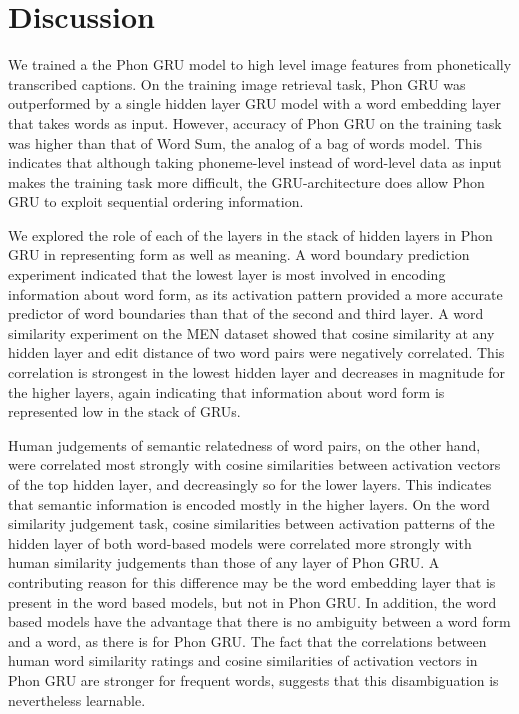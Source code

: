 \section{Discussion}
\label{sec:discussion}
We trained a the {\sc Phon GRU} model  to  high level image features  from phonetically transcribed captions. On the training image retrieval task, {\sc Phon GRU} was outperformed by a single hidden layer GRU model with a word embedding layer that takes words as input. However, accuracy of {\sc Phon GRU} on the training task was higher than that of {\sc Word Sum}, the analog of a bag of words model. This indicates that although taking phoneme-level instead of word-level data as input makes the training task more difficult, the GRU-architecture does allow {\sc Phon GRU} to exploit sequential ordering information.

We explored the role of each of the layers in the stack of hidden layers in {\sc Phon GRU} in representing form as well as meaning. A word boundary prediction experiment indicated that the lowest layer is most involved in encoding information about word form, as its activation pattern provided a more accurate predictor of word boundaries than that of the second and third layer. A word similarity experiment on the MEN dataset showed that cosine similarity at any hidden layer and edit distance of two word pairs were negatively correlated. This correlation is strongest in the lowest hidden layer and decreases in magnitude for the higher layers, again indicating that information about word form is represented low in the stack of GRUs.

Human judgements of semantic relatedness of word pairs, on the other hand, were correlated most strongly with cosine similarities between activation vectors of the top hidden layer, and decreasingly so for the lower layers. This indicates that semantic information is encoded mostly in the higher layers. On the word similarity judgement task, cosine similarities between activation patterns of the hidden layer of both word-based models were correlated more strongly with human similarity judgements than those of any layer of {\sc Phon GRU}. A contributing reason for this difference may be the word embedding layer that is present in the word based models, but not in {\sc Phon GRU}. In addition, the word based models have the advantage that there is no ambiguity between a word form and a word, as there is for {\sc Phon GRU}. The fact that the correlations between human word similarity ratings and cosine similarities of activation vectors in {\sc Phon GRU} are stronger for frequent words, suggests that this disambiguation is nevertheless learnable.

